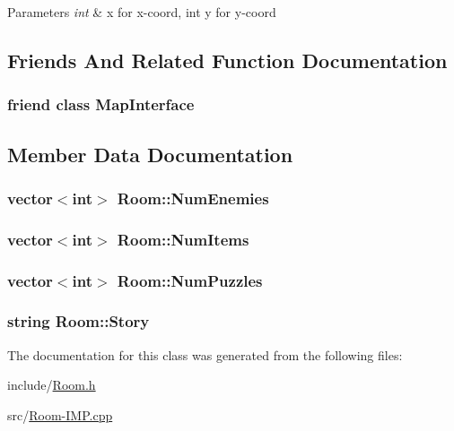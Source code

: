 \begin{DoxyParams}{Parameters}
{\em int} & x for x-\/coord, int y for y-\/coord \\
\hline
\end{DoxyParams}


\subsection{Friends And Related Function Documentation}
\hypertarget{classRoom_a6b33a1839e354ea2276f49c4b492ebcb}{
\subsubsection[{Map\-Interface}]{\setlength{\rightskip}{0pt plus 5cm}friend class {\bf Map\-Interface}\hspace{0.3cm}{\ttfamily [friend]}}}\label{classRoom_a6b33a1839e354ea2276f49c4b492ebcb}


\subsection{Member Data Documentation}
\hypertarget{classRoom_a4b5fb6919c7e49d667f7354008503be5}{
\subsubsection[{Num\-Enemies}]{\setlength{\rightskip}{0pt plus 5cm}vector$<$int$>$ Room\-::\-Num\-Enemies}}\label{classRoom_a4b5fb6919c7e49d667f7354008503be5}
\hypertarget{classRoom_a8b38e13368e3385e52f52160ce896425}{
\subsubsection[{Num\-Items}]{\setlength{\rightskip}{0pt plus 5cm}vector$<$int$>$ Room\-::\-Num\-Items}}\label{classRoom_a8b38e13368e3385e52f52160ce896425}
\hypertarget{classRoom_a3b1cde750b4a871c6c077c75355d3baa}{
\subsubsection[{Num\-Puzzles}]{\setlength{\rightskip}{0pt plus 5cm}vector$<$int$>$ Room\-::\-Num\-Puzzles}}\label{classRoom_a3b1cde750b4a871c6c077c75355d3baa}
\hypertarget{classRoom_a6b940c409515c78e35eaa50e28a3d2d6}{
\subsubsection[{Story}]{\setlength{\rightskip}{0pt plus 5cm}string Room\-::\-Story}}\label{classRoom_a6b940c409515c78e35eaa50e28a3d2d6}


The documentation for this class was generated from the following files\-:\begin{DoxyCompactItemize}
\item 
include/\hyperlink{Room_8h}{Room.\-h}\item 
src/\hyperlink{Room-IMP_8cpp}{Room-\/\-I\-M\-P.\-cpp}\end{DoxyCompactItemize}
